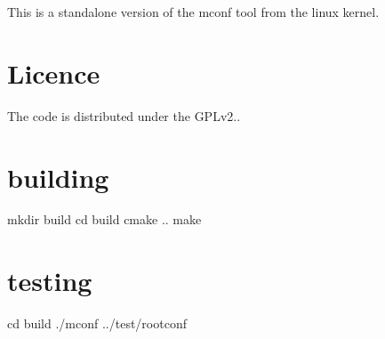 This is a standalone version of the mconf tool from the linux kernel.

\section*{Licence }

The code is distributed under the G\-P\-Lv2..

\section*{building }

\begin{DoxyVerb}mkdir build
cd build
cmake ..
make
\end{DoxyVerb}


\section*{testing }

\begin{DoxyVerb}cd build
./mconf ../test/rootconf\end{DoxyVerb}
 